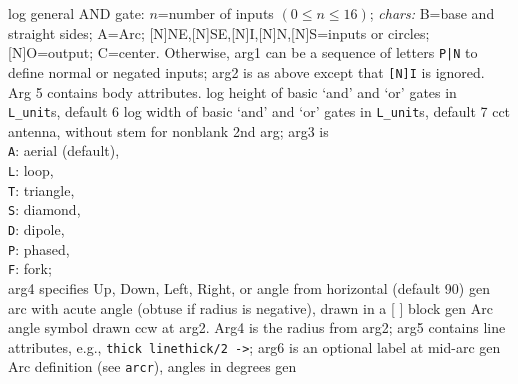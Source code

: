 %
  {log}%
  {general AND gate: $n$=number of inputs $(0\leq n\leq 16)$;
           {\sl chars:}
           B=base and straight sides; A=Arc;
           [N]NE,[N]SE,[N]I,[N]N,[N]S=inputs or circles;
           [N]O=output; C=center.
   Otherwise, arg1 can be a sequence of letters {\tt P|N}
   to define normal or negated inputs; arg2 is as above except that
   {\tt [N]I} is ignored. Arg 5 contains body attributes.}%
%
  {log}%
  {height of basic `and' and `or' gates in {\tt L\_unit}s, default 6}%
%
  {log}%
  {width of basic `and' and `or' gates in {\tt L\_unit}s, default 7}%
%
  {cct}%
  {antenna, without stem for nonblank 2nd arg; arg3 is\\
    {\tt A}: aerial (default),\\
    {\tt L}: loop,\\
    {\tt T}: triangle,\\
    {\tt S}: diamond,\\
    {\tt D}: dipole,\\
    {\tt P}: phased,\\
    {\tt F}: fork;\\
    arg4 specifies Up, Down, Left, Right, or angle from horizontal (default 90) 
   }%
%
  {gen}%
  {arc with acute angle (obtuse if radius is negative), drawn in a [ ] block}%
%
  {gen}%
  {Arc angle symbol drawn ccw at arg2. Arg4 is the radius from arg2;
     arg5 contains line attributes, e.g., {\tt thick linethick/2 ->};
     arg6 is an optional label at mid-arc}%
%
  {gen}%
  {Arc definition (see {\tt arcr}), angles in degrees
    }%
%
  {gen}%
